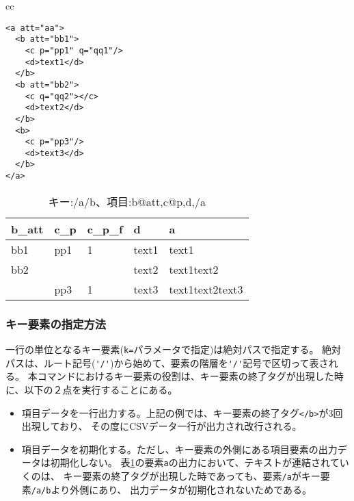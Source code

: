 \begin{table}[htbp]
\begin{center}
\begin{tabular}{cc}

\begin{minipage}{0.4\hsize}
\caption{入力XMLデータ\label{tbl:mxml2csv_input}}
\begin{verbatim}
<a att="aa">
  <b att="bb1">
    <c p="pp1" q="qq1"/>
    <d>text1</d>
  </b>
  <b att="bb2">
    <c q="qq2"></c>
    <d>text2</d>
  </b>
  <b>
    <c p="pp3"/>
    <d>text3</d>
  </b>
</a>
\end{verbatim}
\end{minipage}

\begin{minipage}{0.4\hsize}
\begin{center}
\caption{キー:/a/b、項目:b@att,c@p,d,/a\label{tbl:mxml2csv_out1}}
{\small
\begin{tabular}{lllll}
\hline
b\_att&c\_p&c\_p\_f&d&a \\
\hline
bb1&pp1&1&text1&text1 \\
bb2&&&text2&text1text2 \\
&pp3&1&text3&text1text2text3 \\

\hline

\end{tabular}
}
\end{center}
\end{minipage}

\end{tabular}
\end{center}
\end{table}

\subsubsection*{キー要素の指定方法}
一行の単位となるキー要素(\verb|k=|パラメータで指定)は絶対パスで指定する。
絶対パスは、ルート記号(\verb|'/'|)から始めて、要素の階層を\verb|'/'|記号で区切って表される。
本コマンドにおけるキー要素の役割は、キー要素の終了タグが出現した時に、以下の２点を実行することにある。
\begin{itemize}
\item 項目データを一行出力する。上記の例では、キー要素の終了タグ\verb|</b>|が3回出現しており、
その度にCSVデータ一行が出力され改行される。
\item 項目データを初期化する。ただし、キー要素の外側にある項目要素の出力データは初期化しない。
表\ref{tbl:mxml2csv_out1}の要素\verb|a|の出力において、テキストが連結されていくのは、
キー要素の終了タグが出現した時であっても、要素\verb|/a|がキー要素\verb|/a/b|より外側にあり、
出力データが初期化されないためである。
\end{itemize}

